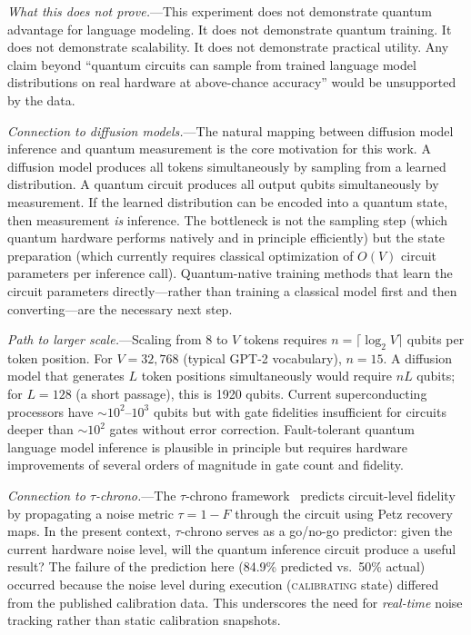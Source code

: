 \documentclass[prl,twocolumn,superscriptaddress,longbibliography,floatfix]{revtex4-2}
\begin{document}
\emph{What this does not prove.}---This experiment does not demonstrate quantum advantage for language modeling. It does not demonstrate quantum training. It does not demonstrate scalability. It does not demonstrate practical utility. Any claim beyond ``quantum circuits can sample from trained language model distributions on real hardware at above-chance accuracy'' would be unsupported by the data.

\emph{Connection to diffusion models.}---The natural mapping between diffusion model inference and quantum measurement is the core motivation for this work. A diffusion model produces all tokens simultaneously by sampling from a learned distribution. A quantum circuit produces all output qubits simultaneously by measurement. If the learned distribution can be encoded into a quantum state, then measurement \emph{is} inference. The bottleneck is not the sampling step (which quantum hardware performs natively and in principle efficiently) but the state preparation (which currently requires classical optimization of $O(V)$ circuit parameters per inference call). Quantum-native training methods that learn the circuit parameters directly---rather than training a classical model first and then converting---are the necessary next step.

\emph{Path to larger scale.}---Scaling from 8 to $V$ tokens requires $n = \lceil \log_2 V \rceil$ qubits per token position. For $V = 32{,}768$ (typical GPT-2 vocabulary), $n = 15$. A diffusion model that generates $L$ token positions simultaneously would require $nL$ qubits; for $L = 128$ (a short passage), this is 1920 qubits. Current superconducting processors have $\sim$$10^2$--$10^3$ qubits but with gate fidelities insufficient for circuits deeper than $\sim$$10^2$ gates without error correction. Fault-tolerant quantum language model inference is plausible in principle but requires hardware improvements of several orders of magnitude in gate count and fidelity.

\emph{Connection to $\tau$-chrono.}---The $\tau$-chrono framework~\cite{Huang2026tauchrono} predicts circuit-level fidelity by propagating a noise metric $\tau = 1 - F$ through the circuit using Petz recovery maps. In the present context, $\tau$-chrono serves as a go/no-go predictor: given the current hardware noise level, will the quantum inference circuit produce a useful result? The failure of the prediction here (84.9\% predicted vs.\ 50\% actual) occurred because the noise level during execution (\textsc{calibrating} state) differed from the published calibration data. This underscores the need for \emph{real-time} noise tracking rather than static calibration snapshots.
\end{document}
